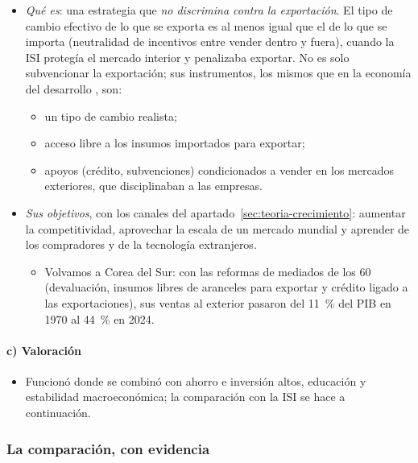 \documentclass[11pt]{article}
\begin{document}
\begin{itemize}
\item \emph{Qué es}: una estrategia que \emph{no discrimina contra la exportación}. El tipo de cambio efectivo de lo que se exporta es al menos igual que el de lo que se importa (neutralidad de incentivos entre vender dentro y fuera), cuando la ISI protegía el mercado interior y penalizaba exportar\nocite{Bhagwati1988Export}. No es solo subvencionar la exportación; sus instrumentos, los mismos que en la economía del desarrollo , son:
  \begin{itemize}
  \item un tipo de cambio realista;
  \item acceso libre a los insumos importados para exportar;
  \item apoyos (crédito, subvenciones) condicionados a vender en los mercados exteriores, que disciplinaban a las empresas.
  \end{itemize}
\item \emph{Sus objetivos}, con los canales del apartado~\ref{sec:teoria-crecimiento}: aumentar la competitividad, aprovechar la escala de un mercado mundial y aprender de los compradores y de la tecnología extranjeros.
  \begin{itemize}
  \item Volvamos a Corea del Sur: con las reformas de mediados de los 60 (devaluación, insumos libres de aranceles para exportar y crédito ligado a las exportaciones), sus ventas al exterior pasaron del 11~\% del PIB en 1970 al 44~\% en 2024\nocite{BancoMundial2026Corea,BM1993Milagro}.
  \end{itemize}
\end{itemize}

\paragraph{c) Valoración}

\begin{itemize}
\item Funcionó donde se combinó con ahorro e inversión altos, educación y estabilidad macroeconómica\nocite{BM1993Milagro}; la comparación con la ISI se hace a continuación.
\end{itemize}

\subsubsection{La comparación, con evidencia}\label{sec:isi-ioe}
\end{document}
